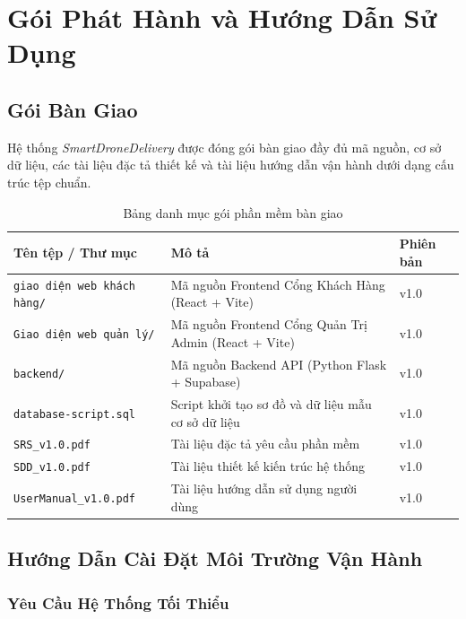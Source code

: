 \chapter{Gói Phát Hành và Hướng Dẫn Sử Dụng}

\section{Gói Bàn Giao}

Hệ thống \textit{SmartDroneDelivery} được đóng gói bàn giao đầy đủ mã nguồn, cơ sở dữ liệu, các tài liệu đặc tả thiết kế và tài liệu hướng dẫn vận hành dưới dạng cấu trúc tệp chuẩn.

\begin{table}[htbp]
  \centering
  \begin{tabularx}{\textwidth}{|l|X|l|}
    \hline
    \textbf{Tên tệp / Thư mục} & \textbf{Mô tả} & \textbf{Phiên bản} \\
    \hline
    \texttt{giao diện web khách hàng/} & Mã nguồn Frontend Cổng Khách Hàng (React + Vite) & v1.0 \\ \hline
    \texttt{Giao diện web quản lý/}    & Mã nguồn Frontend Cổng Quản Trị Admin (React + Vite) & v1.0 \\ \hline
    \texttt{backend/}                  & Mã nguồn Backend API (Python Flask + Supabase) & v1.0 \\ \hline
    \texttt{database-script.sql}       & Script khởi tạo sơ đồ và dữ liệu mẫu cơ sở dữ liệu & v1.0 \\ \hline
    \texttt{SRS\_v1.0.pdf}             & Tài liệu đặc tả yêu cầu phần mềm & v1.0 \\ \hline
    \texttt{SDD\_v1.0.pdf}             & Tài liệu thiết kế kiến trúc hệ thống & v1.0 \\ \hline
    \texttt{UserManual\_v1.0.pdf}      & Tài liệu hướng dẫn sử dụng người dùng & v1.0 \\
    \hline
  \end{tabularx}
  \caption{Bảng danh mục gói phần mềm bàn giao}
  \label{tab:package}
\end{table}

\section{Hướng Dẫn Cài Đặt Môi Trường Vận Hành}

\subsection{Yêu Cầu Hệ Thống Tối Thiểu}

